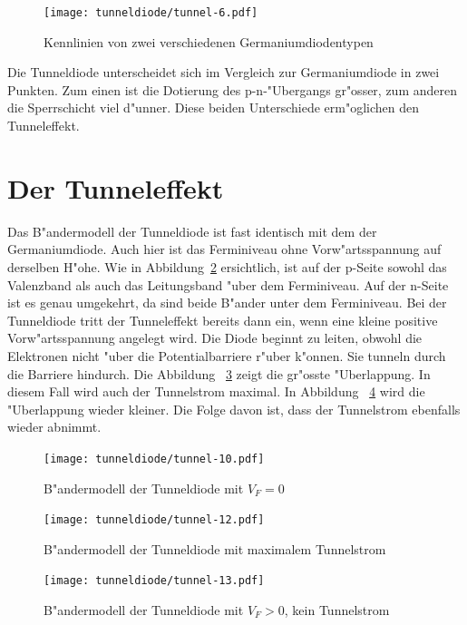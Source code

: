 \begin{refsection}
\begin{figure}	%
\centering
\texttt{[image: tunneldiode/tunnel-6.pdf]}
\caption{Kennlinien von zwei verschiedenen Germaniumdiodentypen
\label{tunnel:Germaniumdioden}}
\end{figure}

Die Tunneldiode unterscheidet sich im Vergleich zur Germaniumdiode in zwei Punkten. Zum einen ist die Dotierung des p-n-"Ubergangs gr"osser, zum anderen die Sperrschicht viel d"unner. Diese beiden Unterschiede erm"oglichen den Tunneleffekt.


\section{Der Tunneleffekt}
Das B"andermodell der Tunneldiode ist fast identisch mit dem der Germaniumdiode. 
Auch hier ist das Ferminiveau ohne Vorw"artsspannung auf derselben H"ohe. 
Wie in Abbildung~\ref{tunnel:Baendermodell0} ersichtlich, ist auf der p-Seite sowohl das Valenzband als auch das Leitungsband "uber dem Ferminiveau. 
Auf der n-Seite ist es genau umgekehrt, da sind beide B"ander unter dem Ferminiveau.
Bei der Tunneldiode tritt der Tunneleffekt bereits dann ein, wenn eine kleine positive Vorw"artsspannung angelegt wird. 
Die Diode beginnt zu leiten, obwohl die Elektronen nicht "uber die Potentialbarriere r"uber k"onnen. 
Sie tunneln durch die Barriere hindurch. 
Die Abbildung ~\ref{tunnel:Baendermodellmax} zeigt die gr"osste "Uberlappung. 
In diesem Fall wird auch der Tunnelstrom maximal. 
In Abbildung ~\ref{tunnel:Baendermodellmin} wird die "Uberlappung wieder kleiner. 
Die Folge davon ist, dass der Tunnelstrom ebenfalls wieder abnimmt.

\begin{figure}	%
\centering
\texttt{[image: tunneldiode/tunnel-10.pdf]}
\caption{B"andermodell der Tunneldiode mit $V_F = 0$
\label{tunnel:Baendermodell0}}
\end{figure}

\begin{figure}	%
\centering
\texttt{[image: tunneldiode/tunnel-12.pdf]}
\caption{B"andermodell der Tunneldiode mit maximalem Tunnelstrom
\label{tunnel:Baendermodellmax}}
\end{figure}

\begin{figure}	%
\centering
\texttt{[image: tunneldiode/tunnel-13.pdf]}
\caption{B"andermodell der Tunneldiode mit $V_F > 0$, kein Tunnelstrom
\label{tunnel:Baendermodellmin}}
\end{figure}


\end{refsection}

